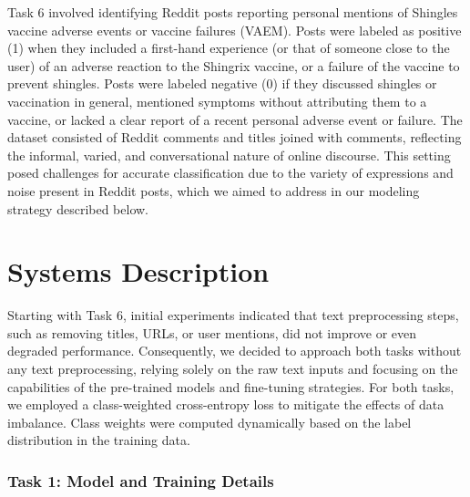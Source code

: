 \documentclass[letterpaper]{article} %
\begin{document}
Task 6 involved identifying Reddit posts reporting personal mentions of Shingles vaccine adverse events or vaccine failures (VAEM).
Posts were labeled as positive (1) when they included a first-hand experience (or that of someone close to the user) of an adverse reaction to the Shingrix vaccine, or a failure of the vaccine to prevent shingles.
Posts were labeled negative (0) if they discussed shingles or vaccination in general, mentioned symptoms without attributing them to a vaccine, or lacked a clear report of a recent personal adverse event or failure.
The dataset consisted of Reddit comments and titles joined with comments, reflecting the informal, varied, and conversational nature of online discourse. This setting posed challenges for accurate classification due to the variety of expressions and noise present in Reddit posts, which we aimed to address in our modeling strategy described below.


\section{Systems Description}

Starting with Task 6, initial experiments indicated that text preprocessing steps, such as removing titles, URLs, or user mentions, did not improve or even degraded performance.
Consequently, we decided to approach both tasks without any text preprocessing, relying solely on the raw text inputs and focusing on the capabilities of the pre-trained models and fine-tuning strategies.
For both tasks, we employed a class-weighted cross-entropy loss to mitigate the effects of data imbalance. Class weights were computed dynamically based on the label distribution in the training data.

\subsubsection{Task 1: Model and Training Details}
\end{document}
